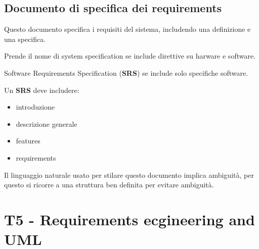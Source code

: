 \documentclass{article}
\begin{document}
\subsection{Documento di specifica dei requirements}

Questo documento specifica i requisiti del sistema, includendo una definizione
e una specifica.

Prende il nome di system specification se include direttive su harware e software.

Software Requirements Specification (\textbf{SRS}) se include solo specifiche software.


Un \textbf{SRS} deve includere:
\begin{itemize}
    \item introduzione
    \item descrizione generale
    \item features
    \item requirements
\end{itemize}

Il linguaggio naturale usato per stilare questo documento implica ambiguità,
per questo si ricorre a una struttura ben definita per evitare ambiguità.

\section{T5 - Requirements ecgineering and UML}
\end{document}

